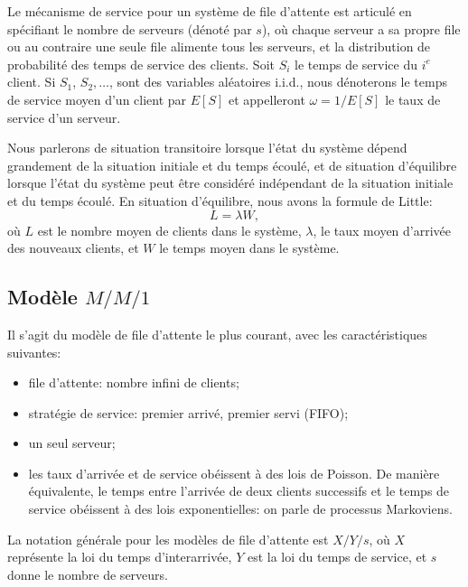 Le mécanisme de service pour un système de file d'attente est articulé
en spécifiant le nombre de serveurs (dénoté par $s$), où chaque
serveur a sa propre file ou au contraire une seule file alimente tous
les serveurs, et la distribution de probabilité des temps de service
des clients.
Soit $S_i$ le temps de service du $i^e$ client.
Si $S_1$, $S_2,\ldots$, sont des variables aléatoires i.i.d., nous dénoterons
le temps de service moyen d'un client par $E[S]$ et appelleront
$\omega = 1/E[S]$ le taux de service d'un serveur.

Nous parlerons de situation transitoire lorsque l'état du système dépend grandement de la situation initiale et du temps écoulé, et de situation d'équilibre lorsque l'état du système peut
être considéré indépendant de la situation initiale et du temps écoulé.
En situation d'équilibre, nous avons la formule de Little:
\[
 L=\lambda W,
\]
où
$L$ est le nombre moyen de clients dans le système, $\lambda$, le taux moyen d'arrivée des nouveaux clients, et $W$ le temps moyen dans le système.

\subsection{Modèle $M/M/1$}

Il s'agit du modèle de file d'attente le plus courant, avec les caractéristiques suivantes:
\begin{itemize}
\item
file d'attente: nombre infini de clients;
\item
stratégie de service: premier arrivé, premier servi (FIFO);
\item
un seul serveur;
\item
les taux d'arrivée et de service obéissent à des lois de Poisson.
De manière équivalente, le temps entre l'arrivée de deux clients successifs et le temps de service obéissent à des lois exponentielles: on parle de processus Markoviens.
\end{itemize}

La notation générale pour les modèles de file d'attente est $X/Y/s$, où $X$ représente la loi du temps d'interarrivée, $Y$ est la loi du temps de service, et $s$ donne le nombre de serveurs.

